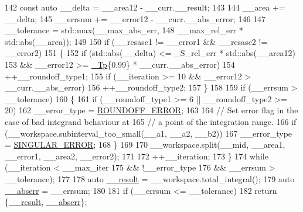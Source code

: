 \begin{DoxyCode}
142           \textcolor{keyword}{const} \textcolor{keyword}{auto} \_\_delta = \_\_area12 - \_\_curr.\_\_result;
143 
144           \_\_area += \_\_delta;
145           \_\_errsum += \_\_error12 - \_\_curr.\_\_abs\_error;
146 
147           \_\_tolerance = std::max(\_\_max\_abs\_err,
148                                  \_\_max\_rel\_err * std::abs(\_\_area));
149 
150           \textcolor{keywordflow}{if} (\_\_resasc1 != \_\_error1 && \_\_resasc2 != \_\_error2)
151             \{
152               \textcolor{keywordflow}{if} (std::abs(\_\_delta) <= \_S\_rel\_err * std::abs(\_\_area12)
153                   && \_\_error12 >= \hyperlink{namespace____gnu__cxx_a3b19a9c800ca194374ef9172290f7d79}{\_Tp}\{0.99\} * \_\_curr.\_\_abs\_error)
154                 ++\_\_roundoff\_type1;
155               \textcolor{keywordflow}{if} (\_\_iteration >= 10 && \_\_error12 > \_\_curr.\_\_abs\_error)
156                 ++\_\_roundoff\_type2;
157             \}
158 
159           \textcolor{keywordflow}{if} (\_\_errsum > \_\_tolerance)
160             \{
161               \textcolor{keywordflow}{if} (\_\_roundoff\_type1 >= 6 || \_\_roundoff\_type2 >= 20)
162                 \_\_error\_type = \hyperlink{namespace____gnu__cxx_ad6c62dd86a596716cece6ac2d4cfd4b3a29574de87143c7715e9a138d7340e8ae}{ROUNDOFF\_ERROR};
163 
164               \textcolor{comment}{// Set error flag in the case of bad integrand behaviour at}
165               \textcolor{comment}{// a point of the integration range.}
166               \textcolor{keywordflow}{if} (\_\_workspace.subinterval\_too\_small(\_\_a1, \_\_a2, \_\_b2))
167                 \_\_error\_type = \hyperlink{namespace____gnu__cxx_ad6c62dd86a596716cece6ac2d4cfd4b3a8e955ea89d59c116d92f16f345620d04}{SINGULAR\_ERROR};
168             \}
169 
170           \_\_workspace.split(\_\_mid, \_\_area1, \_\_error1, \_\_area2, \_\_error2);
171 
172           ++\_\_iteration;
173         \}
174       \textcolor{keywordflow}{while} (\_\_iteration < \_\_max\_iter
175              && !\_\_error\_type
176              && \_\_errsum > \_\_tolerance);
177 
178       \textcolor{keyword}{auto} \hyperlink{namespace____gnu__cxx_a500ea9f53aeaecd8c2ae657503450578}{\_\_result} = \_\_workspace.total\_integral();
179       \textcolor{keyword}{auto} \hyperlink{namespace____gnu__cxx_a72f736cff127f1574e91a301de9e074b}{\_\_abserr} = \_\_errsum;
180 
181       \textcolor{keywordflow}{if} (\_\_errsum <= \_\_tolerance)
182         \textcolor{keywordflow}{return} \{\hyperlink{namespace____gnu__cxx_a500ea9f53aeaecd8c2ae657503450578}{\_\_result}, \hyperlink{namespace____gnu__cxx_a72f736cff127f1574e91a301de9e074b}{\_\_abserr}\};

\end{DoxyCode}
